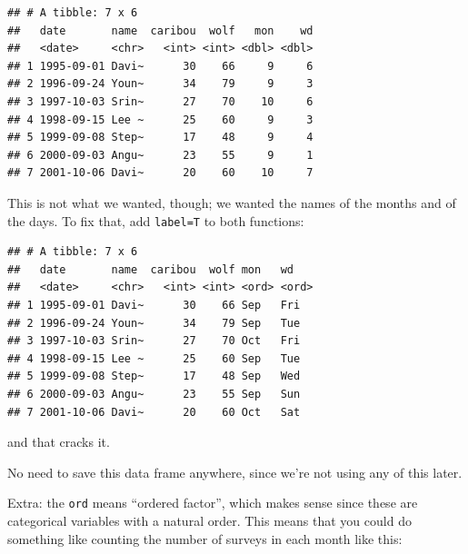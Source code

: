 \documentclass[]{tufte-book}
\newenvironment{Shaded}{}{}
\newcommand{\DataTypeTok}[1]{\textcolor[rgb]{0.56,0.13,0.00}{#1}}
\newcommand{\KeywordTok}[1]{\textcolor[rgb]{0.00,0.44,0.13}{\textbf{#1}}}
\newcommand{\NormalTok}[1]{#1}
\newcommand{\OperatorTok}[1]{\textcolor[rgb]{0.40,0.40,0.40}{#1}}
\newcommand{\StringTok}[1]{\textcolor[rgb]{0.25,0.44,0.63}{#1}}
\theoremstyle{definition}
\theoremstyle{definition}
\theoremstyle{definition}
\theoremstyle{remark}
\begin{document}
\begin{verbatim}
## # A tibble: 7 x 6
##   date       name  caribou  wolf   mon    wd
##   <date>     <chr>   <int> <int> <dbl> <dbl>
## 1 1995-09-01 Davi~      30    66     9     6
## 2 1996-09-24 Youn~      34    79     9     3
## 3 1997-10-03 Srin~      27    70    10     6
## 4 1998-09-15 Lee ~      25    60     9     3
## 5 1999-09-08 Step~      17    48     9     4
## 6 2000-09-03 Angu~      23    55     9     1
## 7 2001-10-06 Davi~      20    60    10     7
\end{verbatim}

This is not what we wanted, though; we wanted the names of the months
and of the days. To fix that, add \texttt{label=T} to both functions:

\begin{Shaded}
\end{Shaded}

\begin{verbatim}
## # A tibble: 7 x 6
##   date       name  caribou  wolf mon   wd   
##   <date>     <chr>   <int> <int> <ord> <ord>
## 1 1995-09-01 Davi~      30    66 Sep   Fri  
## 2 1996-09-24 Youn~      34    79 Sep   Tue  
## 3 1997-10-03 Srin~      27    70 Oct   Fri  
## 4 1998-09-15 Lee ~      25    60 Sep   Tue  
## 5 1999-09-08 Step~      17    48 Sep   Wed  
## 6 2000-09-03 Angu~      23    55 Sep   Sun  
## 7 2001-10-06 Davi~      20    60 Oct   Sat
\end{verbatim}

and that cracks it.

No need to save this data frame anywhere, since we're not using any of
this later.

Extra: the \texttt{ord} means ``ordered factor'', which makes sense
since these are categorical variables with a natural order. This means
that you could do something like counting the number of surveys in each
month like this:

\begin{Shaded}
\end{Shaded}
\end{document}
